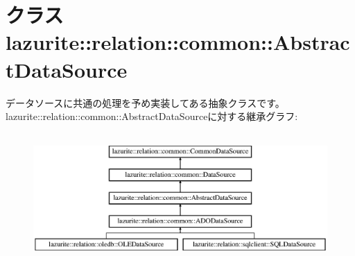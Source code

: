 \hypertarget{classlazurite_1_1relation_1_1common_1_1_abstract_data_source}{
\section{クラス lazurite::relation::common::AbstractDataSource}
\label{classlazurite_1_1relation_1_1common_1_1_abstract_data_source}
}


データソースに共通の処理を予め実装してある抽象クラスです。  
lazurite::relation::common::AbstractDataSourceに対する継承グラフ:\begin{figure}[H]
\begin{center}
\leavevmode
\includegraphics[height=4.96454cm]{classlazurite_1_1relation_1_1common_1_1_abstract_data_source}
\end{center}
\end{figure}
